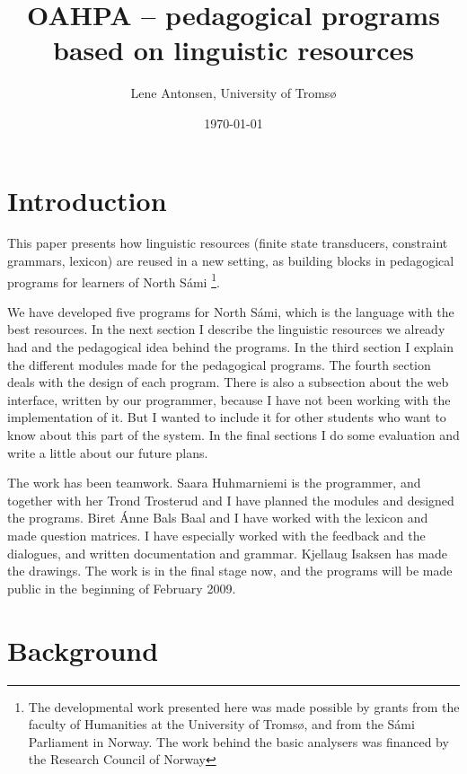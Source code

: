 \documentclass[a4paper,12pt]{article}
\begin{document}
\title{OAHPA -- pedagogical programs based on linguistic resources}

\author{Lene Antonsen, University of Tromsø}
\date{\today}
\maketitle
{}
 
\maketitle
\tableofcontents


\section{Introduction}
This paper presents how linguistic resources (finite state transducers, constraint grammars, lexicon) are reused in a new setting, as building blocks in pedagogical programs for learners of North Sámi \footnote{The developmental work presented here was made possible by grants from the faculty of Humanities at the University of Tromsø, and from the Sámi Parliament in Norway. The work behind the basic analysers was financed by the Research Council of Norway}. 

We have developed five programs for North Sámi, which is the language with the best resources. In the next section I describe the linguistic resources we already had and the pedagogical idea behind the programs. In the third section I explain the different modules made for the pedagogical programs. The fourth section deals with the design of each program. There is also a subsection about the web interface, written by our programmer, because I have not been working with the implementation of it. But I wanted to include it for other students who want to know about this part of the system. In the final sections I do some evaluation and write a little about our future plans.

The work has been teamwork. Saara Huhmarniemi is the programmer, and together with her Trond Trosterud and I have planned the modules and designed the programs. Biret Ánne Bals Baal and I have worked with the lexicon and made question matrices. I have especially worked with the feedback and the dialogues, and written documentation and grammar. Kjellaug Isaksen has made the drawings. The work is in the final stage now, and the programs will be made public in the beginning of February 2009. 

\section{Background}
\end{document}
